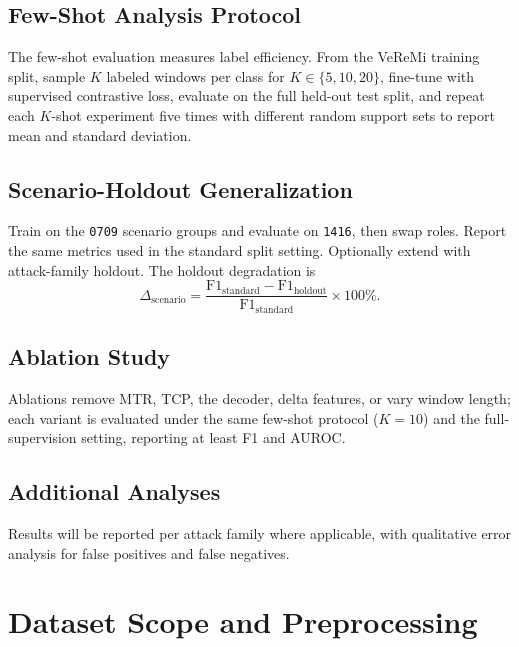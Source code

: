 \documentclass[12pt]{article}
\begin{document}
\subsection{Few-Shot Analysis Protocol}

The few-shot evaluation measures label efficiency. From the VeReMi training split, sample $K$ labeled windows per class for $K \in \{5, 10, 20\}$, fine-tune with supervised contrastive loss, evaluate on the full held-out test split, and repeat each $K$-shot experiment five times with different random support sets to report mean and standard deviation.

\subsection{Scenario-Holdout Generalization}

Train on the \texttt{0709} scenario groups and evaluate on \texttt{1416}, then swap roles. Report the same metrics used in the standard split setting. Optionally extend with attack-family holdout. The holdout degradation is
\begin{equation}
\Delta_{\text{scenario}} = \frac{\text{F1}_{\text{standard}} - \text{F1}_{\text{holdout}}}{\text{F1}_{\text{standard}}} \times 100\%.
\end{equation}

\subsection{Ablation Study}

Ablations remove MTR, TCP, the decoder, delta features, or vary window length; each variant is evaluated under the same few-shot protocol ($K = 10$) and the full-supervision setting, reporting at least F1 and AUROC.

\subsection{Additional Analyses}

Results will be reported per attack family where applicable, with qualitative error analysis for false positives and false negatives.

\section{Dataset Scope and Preprocessing}

\begingroup
\setlength{\intextsep}{4pt plus 2pt minus 2pt}
\setlength{\textfloatsep}{6pt plus 3pt minus 3pt}
\setlength{\floatsep}{6pt plus 3pt minus 3pt}
\captionsetup{skip=4pt}
\end{document}
